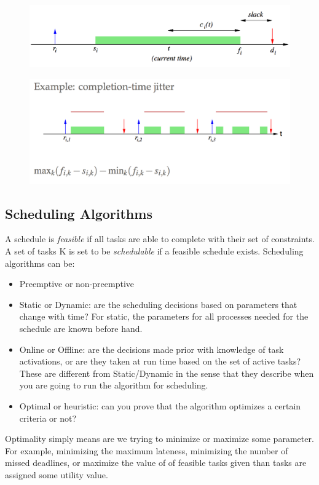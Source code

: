 \documentclass{hw}
\begin{document}
\begin{figure}[H]
  \centering
  \includegraphics[scale=.6]{schedule}
\end{figure}
\begin{figure}[H]
  \centering
  \includegraphics[scale=.6]{jitter}
\end{figure}

\subsection{Scheduling Algorithms}
A schedule is \emph{feasible} if all tasks are able to complete with
their set of constraints. A set of tasks K is set to be \emph{schedulable} if a 
feasible schedule exists. Scheduling algorithms can be:
\begin{itemize}
  \item Preemptive or non-preemptive
  \item Static or Dynamic: are the scheduling decisions based on parameters that
    change with time? For static, the parameters for all processes needed for the
    schedule are known before hand.
  \item Online or Offline: are the decisions made prior with knowledge of task 
    activations, or are they taken at run time based on the set of active tasks?
    These are different from Static/Dynamic in the sense that they describe when
    you are going to run the algorithm for scheduling. 
  \item Optimal or heuristic: can you prove that the algorithm optimizes a 
    certain criteria or not?
\end{itemize}
Optimality simply means are we trying to minimize or maximize some parameter. 
For example, minimizing the maximum lateness, minimizing the number of missed 
deadlines, or maximize the value of of feasible tasks given than tasks are 
assigned some utility value.
\end{document}
